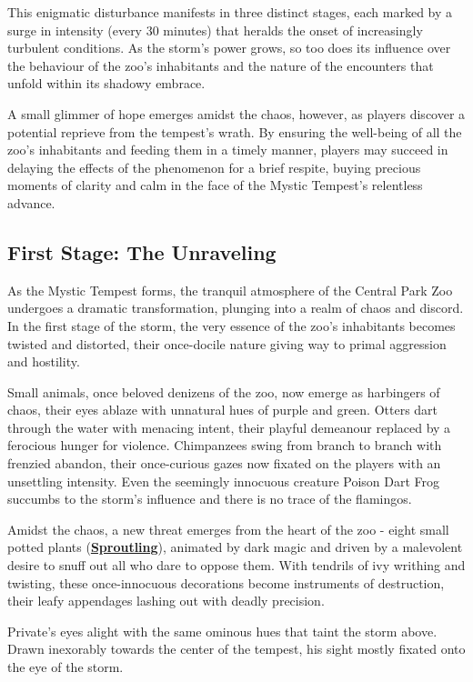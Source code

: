 This enigmatic disturbance manifests in three distinct stages, each marked by a surge in intensity (every 30 minutes) that heralds the onset of increasingly turbulent conditions. As the storm's power grows, so too does its influence over the behaviour of the zoo's inhabitants and the nature of the encounters that unfold within its shadowy embrace.

A small glimmer of hope emerges amidst the chaos, however, as players discover a potential reprieve from the tempest's wrath. By ensuring the well-being of all the zoo's inhabitants and feeding them in a timely manner, players may succeed in delaying the effects of the phenomenon for a brief respite, buying precious moments of clarity and calm in the face of the Mystic Tempest's relentless advance.
\subsection*{First Stage: The Unraveling}
As the Mystic Tempest forms, the tranquil atmosphere of the Central Park Zoo undergoes a dramatic transformation, plunging into a realm of chaos and discord. In the first stage of the storm, the very essence of the zoo's inhabitants becomes twisted and distorted, their once-docile nature giving way to primal aggression and hostility.

Small animals, once beloved denizens of the zoo, now emerge as harbingers of chaos, their eyes ablaze with unnatural hues of purple and green. Otters dart through the water with menacing intent, their playful demeanour replaced by a ferocious hunger for violence. Chimpanzees swing from branch to branch with frenzied abandon, their once-curious gazes now fixated on the players with an unsettling intensity. Even the seemingly innocuous creature Poison Dart Frog succumbs to the storm's influence and there is no trace of the flamingos.

Amidst the chaos, a new threat emerges from the heart of the zoo - eight small potted plants (\hyperref[sec:Sproutling]{\textbf{Sproutling}}), animated by dark magic and driven by a malevolent desire to snuff out all who dare to oppose them. With tendrils of ivy writhing and twisting, these once-innocuous decorations become instruments of destruction, their leafy appendages lashing out with deadly precision.

Private's eyes alight with the same ominous hues that taint the storm above. Drawn inexorably towards the center of the tempest, his sight mostly fixated onto the eye of the storm.

